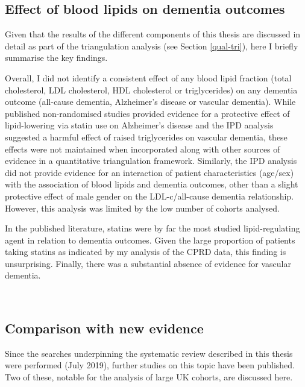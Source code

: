 \documentclass[a4paper, twoside]{templates/ociamthesis}
\begin{document}
\hypertarget{effect-of-blood-lipids-on-dementia-outcomes}{%
\subsection{Effect of blood lipids on dementia outcomes}\label{effect-of-blood-lipids-on-dementia-outcomes}}

Given that the results of the different components of this thesis are discussed in detail as part of the triangulation analysis (see Section \ref{qual-tri}), here I briefly summarise the key findings.

Overall, I did not identify a consistent effect of any blood lipid fraction (total cholesterol, LDL cholesterol, HDL cholesterol or triglycerides) on any dementia outcome (all-cause dementia, Alzheimer's disease or vascular dementia). While published non-randomised studies provided evidence for a protective effect of lipid-lowering via statin use on Alzheimer's disease and the IPD analysis suggested a harmful effect of raised triglycerides on vascular dementia, these effects were not maintained when incorporated along with other sources of evidence in a quantitative triangulation framework. Similarly, the IPD analysis did not provide evidence for an interaction of patient characteristics (age/sex) with the association of blood lipids and dementia outcomes, other than a slight protective effect of male gender on the LDL-c/all-cause dementia relationship. However, this analysis was limited by the low number of cohorts analysed.

In the published literature, statins were by far the most studied lipid-regulating agent in relation to dementia outcomes. Given the large proportion of patients taking statins as indicated by my analysis of the CPRD data, this finding is unsurprising. Finally, there was a substantial absence of evidence for vascular dementia.

~

\hypertarget{comparison-with-new-evidence}{%
\subsection{Comparison with new evidence}\label{comparison-with-new-evidence}}

Since the searches underpinning the systematic review described in this thesis were performed (July 2019), further studies on this topic have been published. Two of these, notable for the analysis of large UK cohorts, are discussed here.
\end{document}
